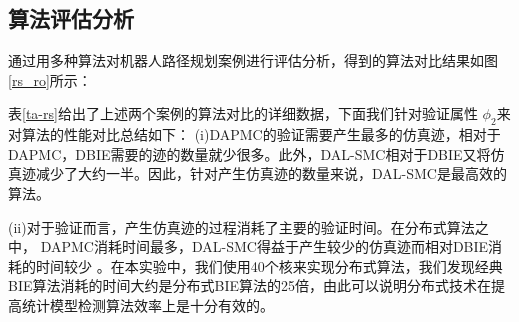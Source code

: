 \subsection{算法评估分析}
通过用多种算法对机器人路径规划案例进行评估分析，得到的算法对比结果如图 \ref{rs_ro}所示：
\begin{figure}[htbp]

\end{figure}

表\ref{ta-rs}给出了上述两个案例的算法对比的详细数据，下面我们针对验证属性 $\phi_2$来对算法的性能对比总结如下：
(i)DAPMC的验证需要产生最多的仿真迹，相对于DAPMC，DBIE需要的迹的数量就少很多。此外，DAL-SMC相对于DBIE又将仿真迹减少了大约一半。因此，针对产生仿真迹的数量来说，DAL-SMC是最高效的算法。

(ii)对于验证而言，产生仿真迹的过程消耗了主要的验证时间。在分布式算法之中， DAPMC消耗时间最多，DAL-SMC得益于产生较少的仿真迹而相对DBIE消耗的时间较少 。在本实验中，我们使用40个核来实现分布式算法，我们发现经典BIE算法消耗的时间大约是分布式BIE算法的25倍，由此可以说明分布式技术在提高统计模型检测算法效率上是十分有效的。

